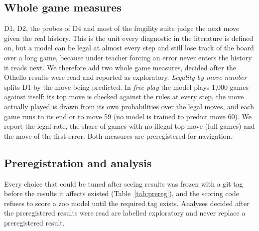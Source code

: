 \documentclass[journal]{IEEEtran}
\begin{document}
\subsection{Whole game measures}
\label{sec:seqmethod}
D1, D2, the probes of D4 and most of the fragility suite judge the next move given the real history. This is the
unit every diagnostic in the literature is defined on, but a model can be legal at almost every step and still lose
track of the board over a long game, because under teacher forcing an error never enters the history it reads next.
We therefore add two whole game measures, decided after the Othello results were read and reported as exploratory.
\emph{Legality by move number} splits D1 by the move being predicted. In \emph{free play} the model plays 1,000
games against itself: its top move is checked against the rules at every step, the move actually played is drawn
from its own probabilities over the legal moves, and each game runs to its end or to move 59 (no model is trained to
predict move 60). We report the legal rate, the share of games with no illegal top move (full games) and the move of
the first error. Both measures are preregistered for navigation.

\subsection{Preregistration and analysis}
\label{sec:analysis}
Every choice that could be tuned after seeing results was frozen with a git tag before the results it affects
existed (Table~\ref{tab:prereg}), and the scoring code refuses to score a zoo model until the required tag exists.
Analyses decided after the preregistered results were read are labelled exploratory and never replace a
preregistered result.
\end{document}
